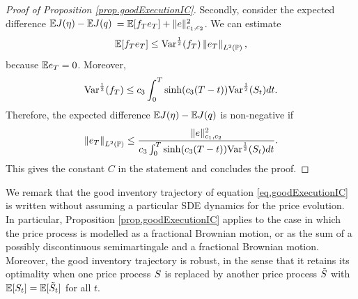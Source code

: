 \documentclass[10pt,a4paper]{article}
\begin{document}
\begin{proof}[Proof of Proposition \ref{prop.goodExecutionIC}]
Secondly, consider the   expected difference $\Expectation \costFunctional (\eta) - \Expectation \costFunctional (\inventory)$ $=\Expectation[f_\timeHorizon e_\timeHorizon] + \normInventoryTrjectories{e}\squared$. We can estimate
\begin{equation*}
\Expectation[f_\timeHorizon e_\timeHorizon] \leq \Variance^{\half}(f_\timeHorizon)\norm[e_\timeHorizon]_{\Ltwo(\Prob)},
\end{equation*}
because $\Expectation e_\timeHorizon = 0$. Moreover, 
\begin{equation*}
\Variance^{\half}(f_\timeHorizon)
\leq \ratioAversionOverImpact \intZeroTimeHorizon \sinh(\ratioAversionOverImpact(\timeHorizon - t))\Variance^{\half}(\fundamentalPrice_t) dt. 
\end{equation*} 
Therefore, the   expected difference $\Expectation \costFunctional (\eta) - \Expectation \costFunctional (\inventory)$ is non-negative if 
\begin{equation*}
\norm[e_\timeHorizon]_{\Ltwo(\Prob)} \leq 
\frac{ \normInventoryTrjectories{e}\squared }{\ratioAversionOverImpact \intZeroTimeHorizon \sinh(\ratioAversionOverImpact(\timeHorizon - t))\Variance^{\half}(\fundamentalPrice_t) dt}.
\end{equation*}
This gives the constant $C$ in the statement and concludes the proof.
\end{proof}

\begin{remark}
We remark that the good inventory trajectory of equation \eqref{eq.goodExecutionIC} is written without assuming a particular SDE dynamics for the price evolution. In particular, Proposition \ref{prop.goodExecutionIC} applies to the case in which the price process is modelled as a fractional Brownian motion, or as the sum of a possibly discontinuous semimartingale and a fractional Brownian motion. 
Moreover, the good inventory trajectory is robust, in the sense that it retains its optimality when one price process $\priceProcess$ is replaced by another price process $\tilde{\priceProcess}$ with $\Expectation[\priceProcess_t] = \Expectation[\tilde{\priceProcess}_t]$ for all $t$.  
\end{remark}
\end{document}
